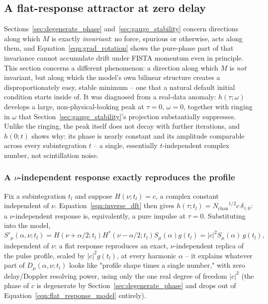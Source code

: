 \documentclass[manuscript]{aastex631}
\newcommand{\Nchan}{\ensuremath{N_\mathrm{chan}}}
\newcommand{\Eqn}[1]{Equation~\ref{eqn:#1}}
\begin{document}
\subsection{A flat-response attractor at zero delay}
\label{sec:flat_response_attractor}

\noindent
Sections~\ref{sec:degenerate_phase} and~\ref{sec:gauge_stability} concern directions along which
$M$ is exactly \emph{invariant}: no force, spurious or otherwise, acts along them, and
\Eqn{grad_rotation} shows the pure-phase part of that invariance cannot accumulate drift under
FISTA momentum even in principle. This section concerns a different phenomenon: a direction along
which $M$ is \emph{not} invariant, but along which the model's own bilinear structure creates a
disproportionately easy, stable minimum -- one that a natural default initial condition starts
inside of. It was diagnosed from a real-data anomaly: $h(\tau;\omega)$ develops a large,
non-physical-looking peak at $\tau=0,\,\omega=0$, together with ringing in $\omega$ that
Section~\ref{sec:gauge_stability}'s projection substantially suppresses. Unlike the ringing, the
peak itself does not decay with further iterations, and $h(0;t)$ shows why: its phase is nearly
constant and its amplitude comparable across every subintegration $t$ -- a single, essentially
$t$-independent complex number, not scintillation noise.

\subsubsection*{A $\nu$-independent response exactly reproduces the profile}

Fix a subintegration $t_l$ and suppose $H(\nu;t_l)=c$, a complex constant independent of $\nu$.
\Eqn{inverse_dft} then gives $h(\tau;t_l) = \Nchan^{1/2} c\,\delta_{\tau,0}$: a $\nu$-independent
response is, equivalently, a pure impulse at $\tau=0$. Substituting into the model,
\begin{equation}
S'_\mu(\alpha,\nu;t_l) = H(\nu+\alpha/2;t_l)H^*(\nu-\alpha/2;t_l)S_\mu(\alpha)g(t_l)
= |c|^2 S_\mu(\alpha)\, g(t_l),
\label{eqn:flat_response_model}
\end{equation}
independent of $\nu$: a flat response reproduces an exact, $\nu$-independent replica of the pulse
profile, scaled by $|c|^2 g(t_l)$, at every harmonic $\alpha$ -- it explains whatever part of
$D_\mu(\alpha,\nu;t_l)$ looks like "profile shape times a single number," with zero delay/Doppler
resolving power, using only the one real degree of freedom $|c|^2$ (the phase of $c$ is degenerate
by Section~\ref{sec:degenerate_phase} and drops out of \Eqn{flat_response_model} entirely).
\end{document}
